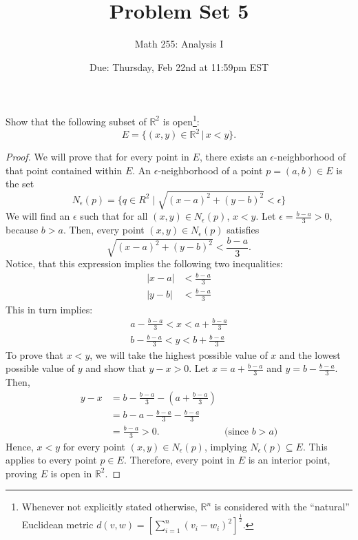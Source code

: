 \documentclass[10pt]{article}
\newcommand{\R}{\mathbb{R}}
\newenvironment{problem}[2][Problem]{\begin{trivlist}
\item[\hskip \labelsep {\bfseries #1}\hskip \labelsep {\bfseries #2.}]}{\end{trivlist}}
\begin{document}
\title{Problem Set 5}
\author{Math 255: Analysis I}
\date{Due: Thursday, Feb 22nd at 11:59pm EST}

\maketitle

\begin{problem}{1}
	Show that the following subset of $\R^2$ is open\footnote{Whenever not explicitly stated otherwise, $ \R^n $ is considered with the ``natural'' Euclidean metric $ d(v,w)=[\sum_{i=1}^n (v_i-w_i)^2]^{\frac{1}{2}} $.}:
	$$E = \{(x,y) \in \R^2 \, \vert \, x < y\}.$$

    \begin{proof}
        We will prove that for every point in $E$, there exists an $\epsilon$-neighborhood of that point contained within $E$.
        An $\epsilon$-neighborhood of a point $p = (a, b) \in E$ is the set
        $$N_\epsilon(p) = \{q \in R^2 \mid \sqrt{(x-a)^2 + (y-b)^2} < \epsilon\}$$
        We will find an $\epsilon$ such that for all $(x, y) \in N_\epsilon(p)$, $x < y$.
        Let $\epsilon = \frac{b-a}{3} > 0$, because $b > a$.
        Then, every point $(x, y) \in N_\epsilon(p)$ satisfies
        $$\sqrt{(x-a)^2 + (y-b)^2} < \frac{b-a}{3}.$$
        Notice, that this expression implies the following two inequalities:
        \begin{align*}
            |x - a| &< \frac{b-a}{3} \\
            |y - b| &< \frac{b-a}{3}
        \end{align*}
        This in turn implies:
        \begin{align*}
            a - \frac{b-a}{3} < x < a + \frac{b-a}{3} \\
            b - \frac{b-a}{3} < y < b + \frac{b-a}{3}
        \end{align*}
        To prove that $x < y$, we will take the highest possible value of $x$ and the lowest possible value of $y$ and show that $y - x > 0$.
        Let $x = a + \frac{b-a}{3}$ and $y = b - \frac{b-a}{3}$.
        Then, 
        \begin{align*}
            y - x &= b - \frac{b-a}{3} - (a + \frac{b-a}{3}) \\
                  &= b - a - \frac{b-a}{3} - \frac{b-a}{3} \\
                  &= \frac{b-a}{3} > 0. & \text{(since $b > a$)}
        \end{align*}
        Hence, $x < y$ for every point $(x, y) \in N_\epsilon(p)$, implying $N_\epsilon(p) \subseteq E$. This applies to every point $p \in E$. Therefore, every point in $E$ is an interior point, proving $E$ is open in $\R^2$.
    \end{proof}
\end{problem}
\medskip
\end{document}
